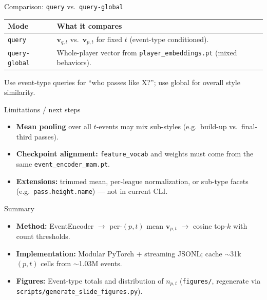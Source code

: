 \documentclass[aspectratio=169]{beamer}
\begin{document}
\begin{frame}{Comparison: \texttt{query} vs.\ \texttt{query-global}}
  \begin{table}
    \centering
    \footnotesize
    \begin{tabular}{p{}p{}}
      \toprule
      Mode & What it compares \\
      \midrule
      \texttt{query} & $\mathbf{v}_{q,t}$ vs.\ $\mathbf{v}_{p,t}$ for fixed $t$ (event-type conditioned). \\
      \texttt{query-global} & Whole-player vector from \texttt{player\_embeddings.pt} (mixed behaviors). \\
      \bottomrule
    \end{tabular}
  \end{table}
  Use event-type queries for ``who passes like X?''; use global for overall style similarity.
\end{frame}

\begin{frame}{Limitations / next steps}
  \begin{itemize}
    \item \textbf{Mean pooling} over all $t$-events may mix sub-styles (e.g.\ build-up vs.\ final-third passes).
    \item \textbf{Checkpoint alignment:} \texttt{feature\_vocab} and weights must come from the same \texttt{event\_encoder\_mam.pt}.
    \item \textbf{Extensions:} trimmed mean, per-league normalization, or sub-type facets (e.g.\ \texttt{pass.height.name}) --- not in current CLI.
  \end{itemize}
\end{frame}

\begin{frame}{Summary}
  \begin{itemize}
    \item \textbf{Method:} EventEncoder $\rightarrow$ per-$(p,t)$ mean $\mathbf{v}_{p,t}$ $\rightarrow$ cosine top-$k$ with count thresholds.
    \item \textbf{Implementation:} Modular PyTorch + streaming JSONL; cache $\sim$31k $(p,t)$ cells from $\sim$1.03M events.
    \item \textbf{Figures:} Event-type totals and distribution of $n_{p,t}$ (\texttt{figures/}, regenerate via \texttt{scripts/generate\_slide\_figures.py}).
  \end{itemize}
\end{frame}
\end{document}
